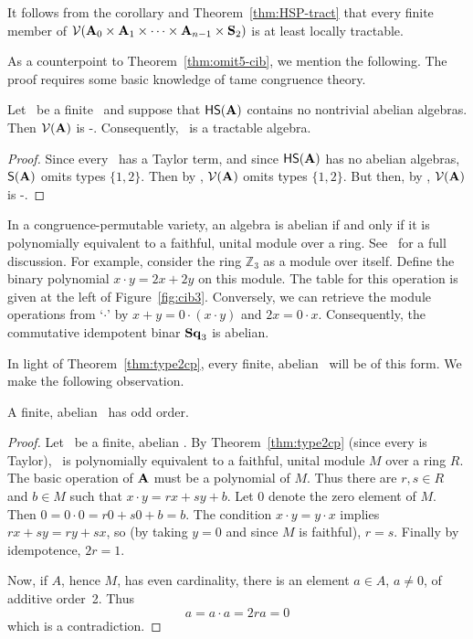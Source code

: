 It follows from the corollary and Theorem~\ref{thm:HSP-tract} that every finite member of $\mathcal{V}(\mathbf{A}_0\times\mathbf{A}_1\times\cdots\times \mathbf{A}_{n-1}\times \mathbf S_2)$ is at least locally tractable. 

As a counterpoint to Theorem~\ref{thm:omit5-cib}, we mention the following. The proof requires some basic knowledge of tame congruence theory.

\begin{theorem}\label{thm:no-abelians}
Let \bA\ be a finite \cib\ and suppose that $\mathsf{H}\mathsf{S}(\mathbf{A})$ contains no nontrivial abelian algebras. Then $\mathcal{V}(\mathbf{A})$ is \sd-\meet. Consequently, \bA\ is a tractable algebra.
\end{theorem}

\begin{proof}
Since every \cib\ has a Taylor term, and since $\mathsf{H}\mathsf{S}(\mathbf{A})$ has no abelian algebras, $\mathsf{S}(\mathbf{A})$ omits types $\{1,2\}$. Then by \cite[Cor~2.2]{Freese:2009}, $\mathcal{V}(\mathbf{A})$ omits types $\{1,2\}$. But then, by \cite[Thm~9.10]{HM:1988}, $\mathcal{V}(\mathbf{A})$ is \sd-\meet.
\end{proof}

In a congruence-permutable variety, an algebra is abelian if and only if it is polynomially equivalent to a faithful, unital module over a ring. See~\cite[Thm~7.35]{MR2839398} for a full discussion. For example, consider the ring $\mathbb Z_3$ as a module over itself. Define the binary polynomial $x\cdot y = 2x+2y$ on this module. The table for this operation is given at the left of Figure~\ref{fig:cib3}. Conversely, we can retrieve the module operations from `$\cdot$' by $x+y = 0\cdot(x\cdot y)$ and $2x=0\cdot x$. Consequently, the commutative idempotent binar $\mathbf{Sq}_{3}$ is abelian. 

In light of Theorem~\ref{thm:type2cp}, every finite, abelian \cib\ will be of this form. We make the following observation. 

\begin{proposition}\label{prop:cib_ab_odd}
A finite, abelian \cib\ has odd order.
\end{proposition}

\begin{proof}
Let \bA\ be a finite, abelian \cib. By Theorem~\ref{thm:type2cp} (since every \cib is Taylor), \bA\ is  polynomially equivalent to a faithful, unital module $M$ over a ring $R$.  The basic operation of $\mathbf{A}$ must be a polynomial of $M$. Thus there are $r,s\in R$ and $b\in M$ such that $x\cdot y = rx + sy +b$. Let 0 denote the zero element of $M$. Then $0=0\cdot 0 = r0 +s0 +b =b$. The condition $x\cdot y = y \cdot x$ implies  $rx+sy = ry+sx$, so (by taking $y=0$ and since $M$ is faithful), $r=s$. Finally by idempotence, $2r=1$. 

Now, if $A$, hence $M$, has even cardinality, there is an element $a\in A$, $a\neq 0$, of additive order~2. Thus
\begin{equation*}
a= a\cdot a = 2ra = 0
\end{equation*}
which is a contradiction.
\end{proof}

